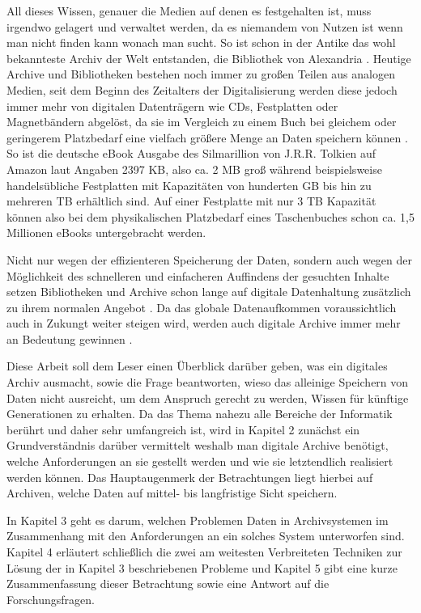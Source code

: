 \documentclass[conference,compsoc,final,a4paper]{IEEEtran}
\begin{document}
All dieses Wissen, genauer die Medien auf denen es festgehalten ist, muss irgendwo gelagert und verwaltet werden, da es niemandem von Nutzen ist wenn man nicht finden kann wonach man sucht. So ist schon in der Antike das wohl bekannteste Archiv der Welt entstanden, die Bibliothek von Alexandria \autocite{BibAlexAntike}. Heutige Archive und Bibliotheken bestehen noch immer zu großen Teilen aus analogen Medien, seit dem Beginn des Zeitalters der Digitalisierung werden diese jedoch immer mehr von digitalen Datenträgern wie CDs, Festplatten oder Magnetbändern abgelöst, da sie im Vergleich zu einem Buch bei gleichem oder geringerem Platzbedarf eine vielfach größere Menge an Daten speichern können \autocite{KLA2015}. So ist die deutsche eBook Ausgabe des Silmarillion von J.R.R. Tolkien auf Amazon laut Angaben 2397 \ac{KB}, also ca. 2 \ac{MB} groß während beispielsweise handelsübliche Festplatten mit Kapazitäten von hunderten \ac{GB} bis hin zu mehreren \ac{TB} erhältlich sind. Auf einer Festplatte mit nur 3 \ac{TB} Kapazität können also bei dem physikalischen Platzbedarf eines Taschenbuches schon ca. 1,5 Millionen eBooks untergebracht werden.

Nicht nur wegen der effizienteren Speicherung der Daten, sondern auch wegen der Möglichkeit des schnelleren und einfacheren Auffindens der gesuchten Inhalte setzen Bibliotheken und Archive schon lange auf digitale Datenhaltung zusätzlich zu ihrem normalen Angebot \autocite{KLA2015}. Da das globale Datenaufkommen voraussichtlich auch in Zukungt weiter steigen wird, werden auch digitale Archive immer mehr an Bedeutung gewinnen \autocite{Reinsel2018}.

Diese Arbeit soll dem Leser einen Überblick darüber geben, was ein digitales Archiv ausmacht, sowie die Frage beantworten, wieso das alleinige Speichern von Daten nicht ausreicht, um dem Anspruch gerecht zu werden, Wissen für künftige Generationen zu erhalten. Da das Thema nahezu alle Bereiche der Informatik berührt und daher sehr umfangreich ist, wird in Kapitel 2 zunächst ein Grundverständnis darüber vermittelt weshalb man digitale Archive benötigt, welche Anforderungen an sie gestellt werden und wie sie letztendlich realisiert werden können. Das Hauptaugenmerk der Betrachtungen liegt hierbei auf Archiven, welche Daten auf mittel- bis langfristige Sicht speichern.

In Kapitel 3 geht es darum, welchen Problemen Daten in Archivsystemen im Zusammenhang mit den Anforderungen an ein solches System unterworfen sind. Kapitel 4 erläutert schließlich die zwei am weitesten Verbreiteten Techniken zur Lösung der in Kapitel 3 beschriebenen Probleme und Kapitel 5 gibt eine kurze Zusammenfassung dieser Betrachtung sowie eine Antwort auf die Forschungsfragen.
\end{document}
